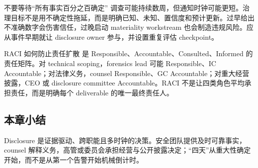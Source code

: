 \begin{warningbox}{不要等待“所有事实百分之百确定”}
调查可能持续数周，但通知时钟可能更短。治理目标不是用不确定性拖延，而是明确已知、未知、置信度和预计更新。过早给出不准确数字会伤害信任，过晚启动 materiality workstream 也会制造违规风险。应从事件早期就让 disclosure owner 参与，并设置重复评估 checkpoint。
\end{warningbox}

\begin{knowledgebox}{RACI 如何防止责任扩散}
 是 Responsible、Accountable、Consulted、Informed 的责任矩阵。对 technical scoping，forensics lead 可能 Responsible、IC Accountable；对法律义务，counsel Responsible、GC Accountable；对重大经营披露，CEO 或 disclosure committee Accountable。RACI 不是让四类角色平均承担责任，而是明确每个 deliverable 的唯一最终责任人。
\end{knowledgebox}

\subsection{本章小结}

Disclosure 是证据驱动、跨职能且多时钟的决策。安全团队提供及时可靠事实，counsel 解释义务，高管或委员会承担经营与公开披露决定；“四天”从重大性确定开始，而不是从第一个告警开始机械倒计时。

